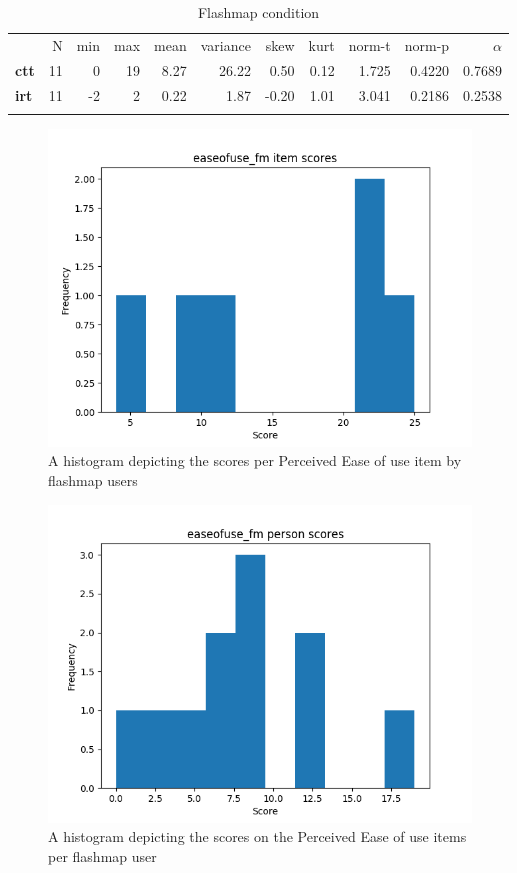 \begin{longtable}[c]{@{}lrrrrrrrrrr@{}}
\caption{Flashmap condition}
\endfirsthead
\toprule\addlinespace
& N & min & max & mean & variance & skew & kurt & norm-t &
norm-p & $\alpha$
\\\addlinespace
\midrule
\textbf{ctt} & 11 & 0 & 19 & 8.27 & 26.22 & 0.50 & 0.12 & 1.725 & 0.4220
& 0.7689
\\\addlinespace
\textbf{irt} & 11 & -2 & 2 & 0.22 & 1.87 & -0.20 & 1.01 & 3.041 & 0.2186
& 0.2538
\\\addlinespace
\bottomrule
    \label{tab:easeofuse_fm}
\end{longtable}

\begin{figure}
    \centering
    \includegraphics[width=.7\textwidth]{img/easeofuse_fm_diff.png}
    \caption{A histogram depicting the scores per Perceived Ease of use item by flashmap users}
    \label{fig:easeofuse_fm_diff}
\end{figure}
\begin{figure}
    \centering
    \includegraphics[width=.7\textwidth]{img/easeofuse_fm_abil.png}
    \caption{A histogram depicting the scores on the Perceived Ease of use items per flashmap user}
    \label{fig:easeofuse_fm_abil}
\end{figure}

